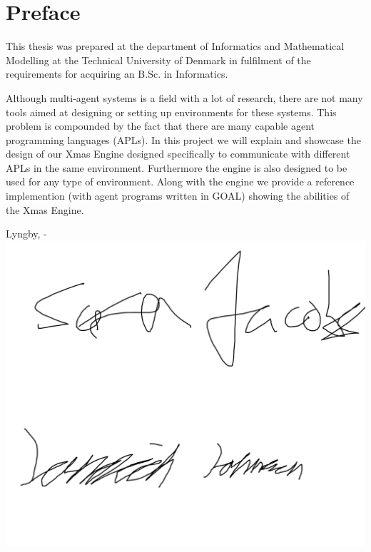 \chapter{Preface}

This thesis was prepared at the department of Informatics and Mathematical Modelling at the Technical University of Denmark in fulfilment of the
requirements for acquiring an B.Sc. in Informatics.

Although multi-agent systems is a field with a lot of research, there are not many tools aimed at designing or setting up environments for these systems. This problem is compounded by the fact that there are many capable agent programming languages (APLs). In this project we will explain and showcase the design of our Xmas Engine designed specifically to communicate with different APLs in the same environment. Furthermore the engine is also designed to be used for any type of environment. Along with the engine we provide a reference implemention (with agent programs written in GOAL) showing the abilities of the Xmas Engine.
\vspace{20mm}
\begin{center}
    \hspace{20mm} Lyngby, \thesishandin-\thesisyear
    \vspace{5mm}
    \newline
    \includegraphics[scale=0.27]{figures/SignatureDummy}
\end{center}
\begin{flushright}
    \thesisauthor
\end{flushright}
